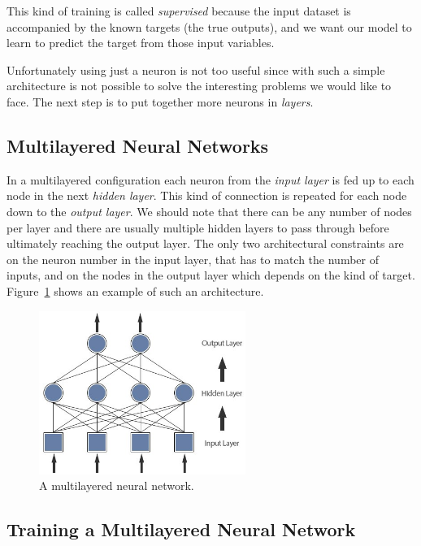 This kind of training is called \emph{supervised} because the input dataset is accompanied by the known targets (the true outputs), and we want our model to learn to predict the target from those input variables.

Unfortunately using just a neuron is not too useful since with such a simple architecture is not possible to solve the interesting problems we would like to face. 
The next step is to put together more neurons in \emph{layers}.

\subsection{Multilayered Neural Networks}
\label{multi-layered-neural-networks}

In a multilayered configuration each neuron from the \emph{input layer} is fed up to each node in the next \emph{hidden layer}. This kind of connection is repeated for each node down to the \emph{output layer}. 
We should note that there can be any number of nodes per layer and there are usually multiple hidden layers to pass through before ultimately reaching the output layer. The only two architectural constraints are on the neuron number in the input layer, that has to match the number of inputs, and on the nodes in the output layer which depends on the kind of target. Figure~\ref{fig:multilayered_nn} shows an example of such an architecture.

\begin{figure}[htb]
\centering
\includegraphics[width=0.6\textwidth]{figures/multilayer.jpeg}
\caption{A multilayered neural network.}
\label{fig:multilayered_nn}
\end{figure}

\subsection{Training a Multilayered Neural Network}
\label{training-a-multilayered-neural-network}

